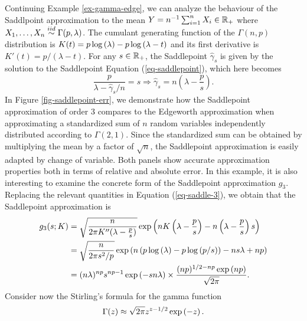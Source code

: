 \begin{example} \label{ex-gamma-saddle}
    Continuing Example \ref{ex-gamma-edge}, we can analyze the behaviour of the Saddlpoint approximation to the mean $Y = n^{-1}\sum_{i=1}^n X_i \in \mathbb{R}_+$ where $X_1, \ldots, X_n \stackrel{iid}{\sim} \Gamma(p, \lambda)$. The cumulant generating function of the $\Gamma(n, p)$ distribution is $K(t) = p\log\left(\lambda\right) - p\log\left(\lambda - t\right)$ and its first derivative is $K'(t) = p / (\lambda - t)$. For any $s \in \mathbb{R}_+$, the Saddlepoint $\hat\gamma_s$ is given by the solution to the Saddlepoint Equation (\ref{eq-saddlepoint}), which here becomes
    \begin{equation*}
        \frac{p}{\lambda - \hat\gamma_s/n} = s \Rightarrow \hat\gamma_s = n\left(\lambda - \frac{p}{s}\right).
    \end{equation*}
    In Figure \ref{fig-saddlepoint-err}, we demonstrate how the Saddlepoint approximation of order 3 compares to the Edgeworth approximation when approximating a standardized sum of $n$ random variables independently distributed according to $\Gamma(2, 1)$. Since the standardized sum can be obtained by multiplying the mean by a factor of $\sqrt{n}$, the Saddlepoint approximation is easily adapted by change of variable. Both panels show accurate approximation properties both in terms of relative and absolute error.
    \newline
    In this example, it is also interesting to examine the concrete form of the Saddlepoint approximation $g_3$. Replacing the relevant quantities in Equation (\ref{eq-saddle-3}), we obtain that the Saddlepoint approximation is
    \begin{align*}
        g_3(s; K) &= \sqrt{\frac{n}{2\pi K''(\lambda - \frac{p}{s})}} \exp\left(nK\left(\lambda - \frac{p}{s}\right) - n\left(\lambda - \frac{p}{s}\right)s\right)\\
        &= \sqrt{\frac{n}{2\pi s^2/p}} \exp\left(n\left(p\log\left(\lambda\right) - p\log\left(p/s\right)\right) - ns\lambda + np\right)\\
        &= (n\lambda)^{np}s^{np-1}\exp\left(-sn\lambda\right) \times \frac{(np)^{1/2-np}\exp\left(np\right)}{\sqrt{2\pi}}.
    \end{align*}
    Consider now the Stirling's formula for the gamma function
    \begin{equation*}
        \Gamma(z) \approx \sqrt{2\pi}z^{z-1/2}\exp\left(-z\right).
    \end{equation*}

\end{example}

